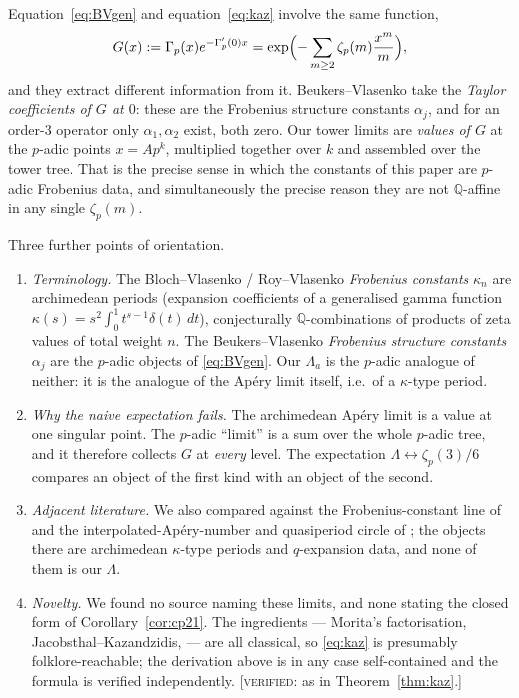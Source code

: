 \documentclass[11pt,reqno]{article}
\newcommand{\QQ}{\mathbb{Q}}
\newcommand{\Gp}{\Gamma_p}
\newcommand{\VER}[1]{{\normalfont\textsc{[verified:} #1\textsc{]}}}
\theoremstyle{plain}
\theoremstyle{definition}
\theoremstyle{remark}
\numberwithin{equation}{section}
\begin{document}
Equation~\eqref{eq:BVgen} and equation~\eqref{eq:kaz} involve the same function,
\[
  G(x):=\Gp(x)e^{-\Gp'(0)x}=\exp\Bigl(-\sum_{m\ge2}\zeta_p(m)\frac{x^m}{m}\Bigr),
\]
and they extract different information from it.  Beukers--Vlasenko take the
\emph{Taylor coefficients of $G$ at $0$}: these are the Frobenius structure
constants $\alpha_j$, and for an order-$3$ operator only $\alpha_1,\alpha_2$
exist, both zero.  Our tower limits are \emph{values of $G$} at the $p$-adic
points $x=Ap^{k}$, multiplied together over $k$ and assembled over the tower
tree.  That is the precise sense in which the constants of this paper are
$p$-adic Frobenius data, and simultaneously the precise reason they are not
$\QQ$-affine in any single $\zeta_p(m)$.

Three further points of orientation.

\begin{enumerate}[label=(\arabic*),leftmargin=2em]
\item \emph{Terminology.}  The Bloch--Vlasenko / Roy--Vlasenko \emph{Frobenius
  constants} $\kappa_n$ \cite{RoyVlasenko,Kerr} are archimedean periods
  (expansion coefficients of a generalised gamma function
  $\kappa(s)=s^2\int_0^1t^{s-1}\delta(t)\,dt$), conjecturally $\QQ$-combinations
  of products of zeta values of total weight $n$.  The Beukers--Vlasenko
  \emph{Frobenius structure constants} $\alpha_j$ \cite{BV2025} are the
  $p$-adic objects of \eqref{eq:BVgen}.  Our $\Lambda_a$ is the $p$-adic
  analogue of neither: it is the analogue of the Ap\'ery limit itself, i.e.\ of
  a $\kappa$-type period.
\item \emph{Why the naive expectation fails.}  The archimedean Ap\'ery limit is
  a value at one singular point.  The $p$-adic ``limit'' is a sum over the whole
  $p$-adic tree, and it therefore collects $G$ at \emph{every} level.  The
  expectation $\Lambda\leftrightarrow\zeta_p(3)/6$ compares an object of the
  first kind with an object of the second.
\item \emph{Adjacent literature.}  We also compared against the Frobenius-constant
  line of \cite{RoyVlasenko,Kerr} and the interpolated-Ap\'ery-number and
  quasiperiod circle of \cite{GolyshevZagier}; the objects there are
  archimedean $\kappa$-type periods and $q$-expansion data, and none of them is
  our $\Lambda$.
\item \emph{Novelty.}  We found no source naming these limits, and none stating
  the closed form of Corollary~\ref{cor:cp21}.  The ingredients --- Morita's
  factorisation, Jacobsthal--Kazandzidis, \cite[eq.~(2)]{BV2025} --- are all
  classical, so \eqref{eq:kaz} is presumably folklore-reachable; the derivation
  above is in any case self-contained and the formula is verified independently.
  \VER{as in Theorem~\ref{thm:kaz}.}
\end{enumerate}
\end{document}
